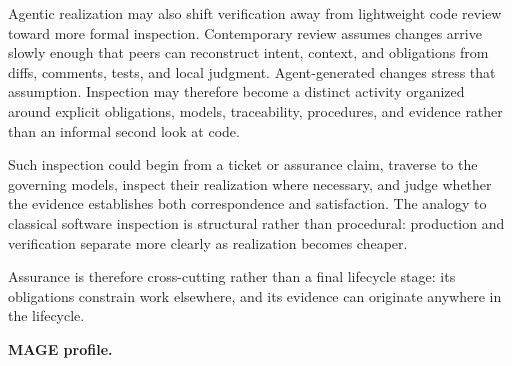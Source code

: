 Agentic realization may also shift verification away from lightweight code review toward more formal inspection. Contemporary review assumes changes arrive slowly enough that peers can reconstruct intent, context, and obligations from diffs, comments, tests, and local judgment. Agent-generated changes stress that assumption. Inspection may therefore become a distinct activity organized around explicit obligations, models, traceability, procedures, and evidence rather than an informal second look at code.

Such inspection could begin from a ticket or assurance claim, traverse to the governing models, inspect their realization where necessary, and judge whether the evidence establishes both correspondence and satisfaction. The analogy to classical software inspection is structural rather than procedural: production and verification separate more clearly as realization becomes cheaper.

Assurance is therefore cross-cutting rather than a final lifecycle stage: its obligations constrain work elsewhere, and its evidence can originate anywhere in the lifecycle.

\textbf{MAGE profile.}

